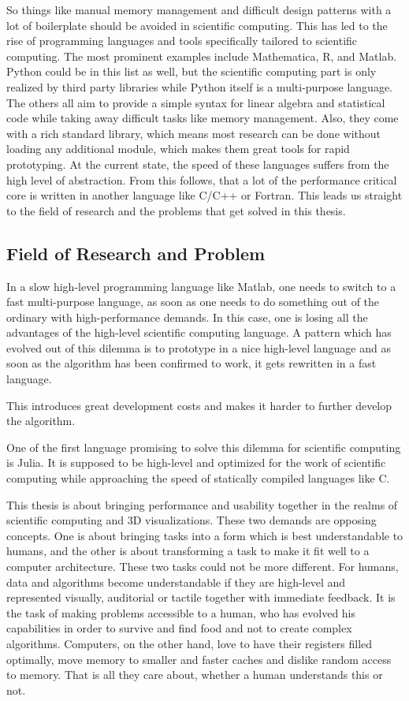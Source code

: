 So things like manual memory management and difficult design patterns with a lot of boilerplate should be avoided in scientific computing.
This has led to the rise of programming languages and tools specifically tailored to scientific computing.
The most prominent examples include Mathematica, R, and Matlab. Python could be in this list as well, but the scientific computing part is only realized by third party libraries while Python itself is a multi-purpose language.
The others all aim to provide a simple syntax for linear algebra and statistical code while taking away difficult tasks like memory management. 
Also, they come with a rich standard library, which means most research can be done without loading any additional module, which makes them great tools for rapid prototyping.
At the current state, the speed of these languages suffers from the high level of abstraction. 
From this follows, that a lot of the performance critical core is written in another language like C/C++ or Fortran. 
This leads us straight to the field of research and the problems that get solved in this thesis.


\subsection{Field of Research and Problem}


In a slow high-level programming language like Matlab, one needs to switch to a fast multi-purpose language, as soon as one needs to do something out of the ordinary with high-performance demands.
In this case, one is losing all the advantages of the high-level scientific computing language.
A pattern which has evolved out of this dilemma is to prototype in a nice high-level language and as soon as the algorithm has been confirmed to work, it gets rewritten in a fast language.

This introduces great development costs and makes it harder to further develop the algorithm.

One of the first language promising to solve this dilemma for scientific computing is Julia. 
It is supposed to be high-level and optimized for the work of scientific computing while approaching the speed of statically compiled languages like C.

This thesis is about bringing performance and usability together in the realms of scientific computing and 3D visualizations.
These two demands are opposing concepts. 
One is about bringing tasks into a form which is best understandable to humans, and the other is about transforming a task to make it fit well to a computer architecture.
These two tasks could not be more different. 
For humans, data and algorithms become understandable if they are high-level and represented visually, auditorial or tactile together with immediate feedback. 
It is the task of making problems accessible to a human, who has evolved his capabilities in order to survive and find food and not to create complex algorithms.
Computers, on the other hand, love to have their registers filled optimally, move memory to smaller and faster caches and dislike random access to memory. That is all they care about, whether a human understands this or not.

